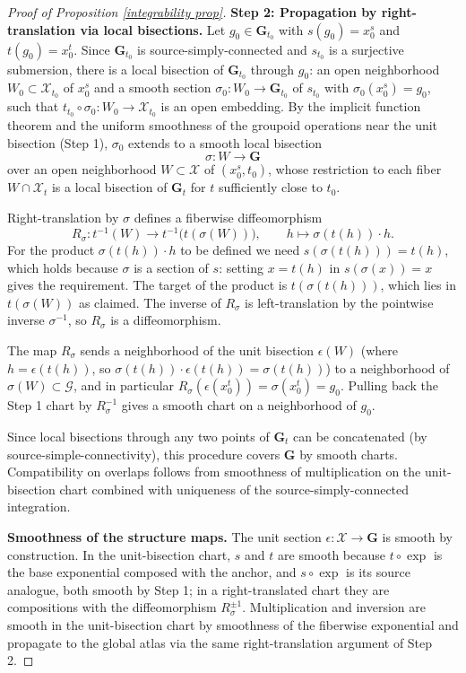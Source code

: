 \documentclass[reqno]{amsart}
\theoremstyle{plain}
\theoremstyle{definition}
\newcommand{\X}{\mathcal{X}}
\begin{document}
\begin{proof}[Proof of Proposition \ref{integrability prop}]
\medskip
\noindent\textbf{Step 2: Propagation by right-translation via local bisections.}
Let $g_0 \in \mathbf{G}_{t_0}$ with $s(g_0) = x_0^s$ and $t(g_0) = x_0^t$. Since $\mathbf{G}_{t_0}$ is source-simply-connected and $s_{t_0}$ is a surjective submersion, there is a local bisection of $\mathbf{G}_{t_0}$ through $g_0$: an open neighborhood $W_0 \subset \X_{t_0}$ of $x_0^s$ and a smooth section
$\sigma_0 : W_0 \to \mathbf{G}_{t_0}$ of $s_{t_0}$ with $\sigma_0(x_0^s) = g_0$, such that $t_{t_0} \circ \sigma_0 : W_0 \to \X_{t_0}$ is an open embedding. By the implicit function theorem and the uniform smoothness of the groupoid operations
near the unit bisection (Step 1), $\sigma_0$ extends to a smooth local bisection
\[
  \sigma : W \longrightarrow \mathbf{G}
\]
over an open neighborhood $W \subset \X$ of $(x_0^s, t_0)$, whose
restriction to each fiber $W \cap \X_t$ is a local bisection of $\mathbf{G}_t$ for $t$ sufficiently close to $t_0$.

Right-translation by $\sigma$ defines a fiberwise diffeomorphism
\begin{equation}
  R_\sigma : t^{-1}(W) \longrightarrow t^{-1}\bigl(t(\sigma(W))\bigr),
  \qquad h \longmapsto \sigma(t(h)) \cdot h.
\end{equation}
For the product $\sigma(t(h)) \cdot h$ to be defined we need
$s(\sigma(t(h))) = t(h)$, which holds because $\sigma$ is a section of $s$: setting $x = t(h)$ in $s(\sigma(x)) = x$ gives the requirement. The target of the product
is $t(\sigma(t(h)))$, which lies in $t(\sigma(W))$ as claimed. The inverse of $R_\sigma$ is left-translation by the pointwise inverse $\sigma^{-1}$, so $R_\sigma$
is a diffeomorphism.

The map $R_\sigma$ sends a neighborhood of the unit bisection $\epsilon(W)$ (where
$h = \epsilon(t(h))$, so $\sigma(t(h)) \cdot \epsilon(t(h)) = \sigma(t(h))$) to a
neighborhood of $\sigma(W) \subset \mathcal{G}$, and in particular
$R_\sigma(\epsilon(x_0^t)) = \sigma(x_0^t) = g_0$. Pulling back the Step 1 chart by $R_\sigma^{-1}$ gives a smooth chart on a neighborhood of $g_0$.

Since local bisections through any two points of $\mathbf{G}_t$ can be concatenated (by source-simple-connectivity), this procedure covers $\mathbf{G}$ by smooth charts. Compatibility on overlaps follows from smoothness of multiplication on the
unit-bisection chart combined with uniqueness of the source-simply-connected integration.

\medskip
\noindent\textbf{Smoothness of the structure maps.}
The unit section $\epsilon : \X \to \mathbf{G}$ is smooth by construction.
In the unit-bisection chart, $s$ and $t$ are smooth because $t \circ \exp$ is the base exponential composed with the anchor, and $s \circ \exp$ is its source analogue, both smooth by Step 1; in a right-translated chart they are compositions
with the diffeomorphism $R_\sigma^{\pm 1}$. Multiplication and inversion are smooth in the unit-bisection chart by smoothness of the fiberwise exponential and propagate to the global atlas via the same right-translation argument of Step 2.


\end{proof}
\end{document}
